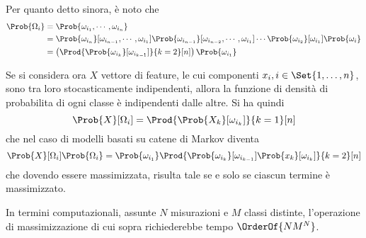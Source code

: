 \documentclass{subfiles}
\begin{document}
Per quanto detto sinora, è noto che
\[\begin{aligned}
        \Prob{\Omega_{i}} & = \Prob{\omega_{i_{1}}, \cdots, \omega_{i_{n}}}                                                                   \\
                          & = \Prob{\omega_{i_{n}}}[\omega_{i_{n - 1}}, \cdots, \omega_{i_{1}}]
        \Prob{\omega_{i_{n - 1}}}[\omega_{i_{n - 2}}, \cdots, \omega_{i_{1}}] \cdots \Prob{\omega_{i_{2}}}[\omega_{i_{1}}]  \Prob{\omega_{i}} \\
                          & = \left( \Prod{\Prob{\omega_{i_{k}}}[\omega_{i_{k - 1}}]}{k = 2}[n] \right) \Prob{\omega_{i_{1}}}
    \end{aligned}\]

Se si considera ora \(X\) vettore di feature, le cui componenti \(x_{i}, i \in \Set{1, \ldots, n}\), sono tra loro stocasticamente indipendenti,
allora la funzione di densità di probabilita di ogni classe è indipendenti dalle altre. Si ha quindi
\[
    \Prob{X}[\Omega_{i}] = \Prod{\Prob{X_{k}}[\omega_{i_{k}}]}{k = 1}[n]
\]
che nel caso di modelli basati su catene di Markov diventa
\[
    \Prob{X}[\Omega_{i}] \Prob{\Omega_{i}} = \Prob{\omega_{i_{1}}} \Prod{ \Prob{\omega_{i_{k}}}[\omega_{i_{k - 1}}]  \Prob{x_{k}}[\omega_{i_{k}}]}{k = 2}[n]
\]
che dovendo essere massimizzata, risulta tale se e solo se ciascun termine è massimizzato.
\begin{Remark*}
    In termini computazionali, assunte \(N\) misurazioni e \(M\) classi distinte, l'operazione di massimizzazione di cui sopra richiederebbe tempo \(\OrderOf{NM^{N}}\).
\end{Remark*}
\end{document}
